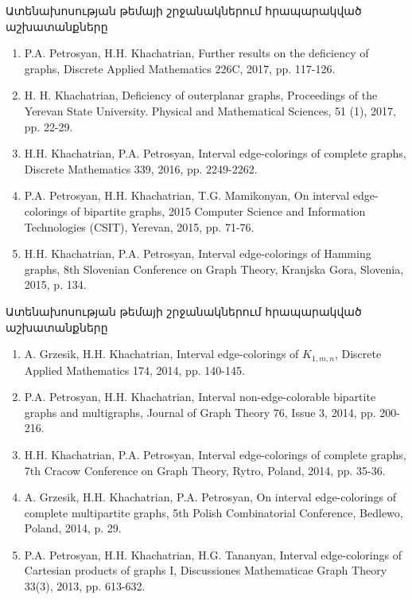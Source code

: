 
\begin{frame}{Ատենախոսության թեմայի շրջանակներում հրապարակված աշխատանքները}
\begin{enumerate}
\justifying
\fontsize{9pt}{10}\selectfont
\item P.A. Petrosyan, H.H. Khachatrian, Further results on the deficiency of graphs, Discrete Applied Mathematics 226C, 2017, pp. 117-126.
\item H. H. Khachatrian, Deficiency of outerplanar graphs, Proceedings of the Yerevan State University. Physical and Mathematical Sciences, 51 (1), 2017, pp. 22-29.
\item H.H. Khachatrian, P.A. Petrosyan, Interval edge-colorings of complete graphs, Discrete Mathematics 339, 2016, pp. 2249-2262.
\item P.A. Petrosyan, H.H. Khachatrian, T.G. Mamikonyan, On interval edge-colorings of bipartite graphs, 2015 Computer Science and Information Technologies (CSIT), Yerevan, 2015, pp. 71-76.
\item H.H. Khachatrian, P.A. Petrosyan, Interval edge-colorings of Hamming graphs, 8th Slovenian Conference on Graph Theory, Kranjska Gora, Slovenia, 2015, p. 134.
\seti
\end{enumerate}
\end{frame}

\begin{frame}{Ատենախոսության թեմայի շրջանակներում հրապարակված աշխատանքները}

\begin{enumerate}
\justifying
\fontsize{9pt}{10}\selectfont
\conti
\item A. Grzesik, H.H. Khachatrian, Interval edge-colorings of $K_{1,m,n}$, Discrete Applied Mathematics 174, 2014, pp. 140-145.
\item P.A. Petrosyan, H.H. Khachatrian, Interval non-edge-colorable bipartite graphs and multigraphs, Journal of Graph Theory 76, Issue 3, 2014, pp. 200-216.
\item H.H. Khachatrian, P.A. Petrosyan, Interval edge-colorings of complete graphs, 7th Cracow Conference on Graph Theory, Rytro, Poland, 2014, pp. 35-36.
\item A. Grzesik, H.H. Khachatrian, P.A. Petrosyan, On interval edge-colorings of complete multipartite graphs, 5th Polish Combinatorial Conference, Bedlewo, Poland, 2014, p. 29.
\item P.A. Petrosyan, H.H. Khachatrian, H.G. Tananyan, Interval edge-colorings of Cartesian products of graphs I, Discussiones Mathematicae Graph Theory 33(3), 2013, pp. 613-632.
\seti
\end{enumerate}
\end{frame}

